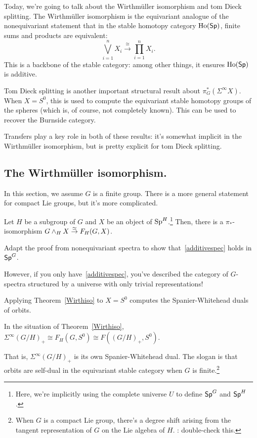 Today, we're going to talk about the Wirthmüller isomorphism and tom Dieck splitting. The Wirthmüller isomorphism
is the equivariant analogue of the nonequivariant statement that in the stable homotopy category $\operatorname{Ho}(\mathsf{Sp})$,
finite sums and products are equivalent:
\begin{equation}
\label{additivespec}
\bigvee_{i=1}^n X_i\stackrel\cong\longrightarrow \prod_{i=1}^n X_i.
\end{equation}
This is a backbone of the stable category: among other things, it ensures $\operatorname{Ho}(\mathsf{Sp})$ is additive.

Tom Dieck splitting is another important structural result about $\pi_G^*(\Sigma^\infty X)$. When $X = S^0$, this
is used to compute the equivariant stable homotopy groups of the spheres (which is, of course, not completely
known). This can be used to recover the Burnside category.

Transfers play a key role in both of these results: it's somewhat implicit in the Wirthmüller isomorphism, but is
pretty explicit for tom Dieck splitting.
\subsection*{The Wirthmüller isomorphism.}
In this section, we assume $G$ is a finite group. There is a more general statement for compact Lie groups, but
it's more complicated.
\begin{thm}
\label{Wirthiso}
Let $H$ be a subgroup of $G$ and $X$ be an object of $\mathrm{Sp}^H$.\footnote{Here, we're implicitly using the complete
universe $U$ to define $\mathsf{Sp}^G$ and $\mathsf{Sp}^H$.} Then, there is a $\pi_*$-isomorphism $G\wedge_H X\stackrel\simeq\to F_H(G,X)$.
\end{thm}
\begin{ex}
Adapt the proof from nonequivariant spectra to show that~\eqref{additivespec} holds in $\mathsf{Sp}^G$.
\end{ex}
However, if you only have~\eqref{additivespec}, you've described the category of $G$-spectra structured by a
universe with only trivial representations!

Applying Theorem~\ref{Wirthiso} to $X = S^0$ computes the Spanier-Whitehead duals of orbits.
\begin{cor}
In the situation of Theorem~\ref{Wirthiso}, $\Sigma^\infty(G/H)_+\cong F_H(G,S^0)\cong F((G/H)_+, S^0)$.
\end{cor}
That is, $\Sigma^\infty (G/H)_+$ is its own Spanier-Whitehead dual. The slogan is that orbits are self-dual in the
equivariant stable category when $G$ is finite.\footnote{When $G$ is a compact Lie group, there's a degree shift
arising from the tangent representation of $G$ on the Lie algebra of $H$. \TODO: double-check this.}

